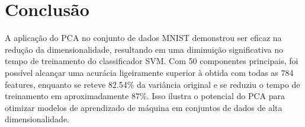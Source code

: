 \documentclass{article}
\begin{document}
\section{Conclusão}
A aplicação do PCA no conjunto de dados MNIST demonstrou ser eficaz na redução da dimensionalidade, resultando em uma diminuição significativa no tempo de treinamento do classificador SVM. Com 50 componentes principais, foi possível alcançar uma acurácia ligeiramente superior à obtida com todas as 784 features, enquanto se reteve 82.54\% da variância original e se reduziu o tempo de treinamento em aproximadamente 87\%. Isso ilustra o potencial do PCA para otimizar modelos de aprendizado de máquina em conjuntos de dados de alta dimensionalidade.
\end{document}
